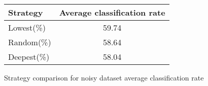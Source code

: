 \begin{figure}[h]
 \begin{center}
  \caption{Strategy comparison for noisy dataset average classification rate}
   \begin{tabular}{ | l || c | }
    \hline
	 Strategy & Average classification rate \\ \hline \hline
        Lowest(\%) & 59.74 \\ \hline
        Random(\%) & 58.64 \\ \hline
        Deepest(\%) & 58.04 \\ \hline
    \end{tabular}
    \label{fig:averageClassificationRate}
\end{center}
\end{figure}



